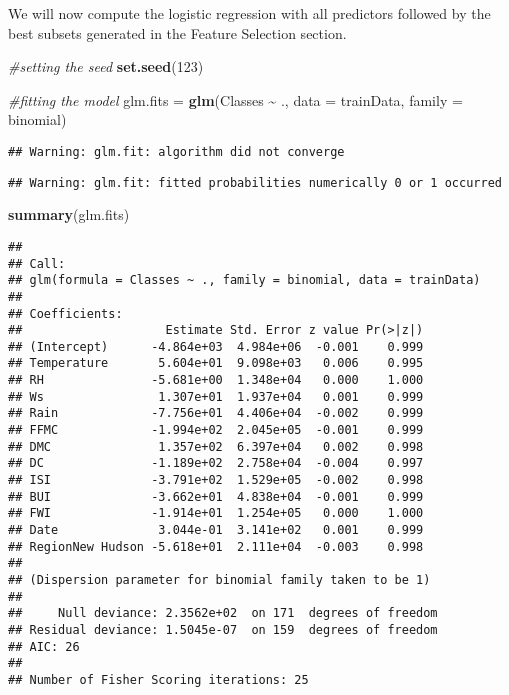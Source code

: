 \documentclass[
]{article}
\newenvironment{Shaded}{\begin{snugshade}}{\end{snugshade}}
\newcommand{\AttributeTok}[1]{\textcolor[rgb]{0.13,0.29,0.53}{#1}}
\newcommand{\CommentTok}[1]{\textcolor[rgb]{0.56,0.35,0.01}{\textit{#1}}}
\newcommand{\DecValTok}[1]{\textcolor[rgb]{0.00,0.00,0.81}{#1}}
\newcommand{\FunctionTok}[1]{\textcolor[rgb]{0.13,0.29,0.53}{\textbf{#1}}}
\newcommand{\NormalTok}[1]{#1}
\newcommand{\OtherTok}[1]{\textcolor[rgb]{0.56,0.35,0.01}{#1}}
\newcommand{\SpecialCharTok}[1]{\textcolor[rgb]{0.81,0.36,0.00}{\textbf{#1}}}
\begin{document}
We will now compute the logistic regression with all predictors followed
by the best subsets generated in the Feature Selection section.

\begin{Shaded}
\begin{Highlighting}[]
\CommentTok{\#setting the seed}
\FunctionTok{set.seed}\NormalTok{(}\DecValTok{123}\NormalTok{)}

\CommentTok{\#fitting the model}
\NormalTok{glm.fits }\OtherTok{=} \FunctionTok{glm}\NormalTok{(Classes }\SpecialCharTok{\textasciitilde{}}\NormalTok{ ., }\AttributeTok{data =}\NormalTok{ trainData, }\AttributeTok{family =}\NormalTok{ binomial)}
\end{Highlighting}
\end{Shaded}

\begin{verbatim}
## Warning: glm.fit: algorithm did not converge
\end{verbatim}

\begin{verbatim}
## Warning: glm.fit: fitted probabilities numerically 0 or 1 occurred
\end{verbatim}

\begin{Shaded}
\begin{Highlighting}[]
\FunctionTok{summary}\NormalTok{(glm.fits)}
\end{Highlighting}
\end{Shaded}

\begin{verbatim}
## 
## Call:
## glm(formula = Classes ~ ., family = binomial, data = trainData)
## 
## Coefficients:
##                    Estimate Std. Error z value Pr(>|z|)
## (Intercept)      -4.864e+03  4.984e+06  -0.001    0.999
## Temperature       5.604e+01  9.098e+03   0.006    0.995
## RH               -5.681e+00  1.348e+04   0.000    1.000
## Ws                1.307e+01  1.937e+04   0.001    0.999
## Rain             -7.756e+01  4.406e+04  -0.002    0.999
## FFMC             -1.994e+02  2.045e+05  -0.001    0.999
## DMC               1.357e+02  6.397e+04   0.002    0.998
## DC               -1.189e+02  2.758e+04  -0.004    0.997
## ISI              -3.791e+02  1.529e+05  -0.002    0.998
## BUI              -3.662e+01  4.838e+04  -0.001    0.999
## FWI              -1.914e+01  1.254e+05   0.000    1.000
## Date              3.044e-01  3.141e+02   0.001    0.999
## RegionNew Hudson -5.618e+01  2.111e+04  -0.003    0.998
## 
## (Dispersion parameter for binomial family taken to be 1)
## 
##     Null deviance: 2.3562e+02  on 171  degrees of freedom
## Residual deviance: 1.5045e-07  on 159  degrees of freedom
## AIC: 26
## 
## Number of Fisher Scoring iterations: 25
\end{verbatim}
\end{document}

